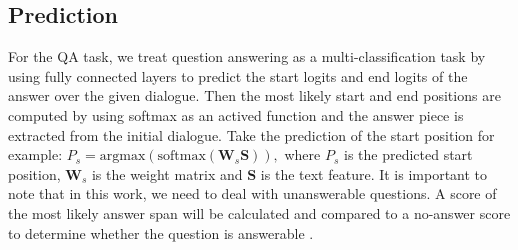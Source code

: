\documentclass[11pt]{article}
\begin{document}
\subsection{Prediction}\label{subsec:answer pred}
For the QA task, we treat question answering as a multi-classification task by using fully connected layers to predict the start logits and end logits of the answer over the given dialogue. Then the most likely start and end positions are computed by using softmax as an actived function and the answer piece is extracted from the initial dialogue. Take the prediction of the start position for example:
$P_s=\textrm{argmax}(\textrm{softmax}(\boldsymbol{W}_{s}\boldsymbol{S})),$ where $P_s$ is the predicted start position, $\boldsymbol{W}_{s}$ is the weight matrix and $\boldsymbol{S}$ is the text feature. It is important to note that in this work, we need to deal with unanswerable questions. A score of the most likely answer span will be calculated and compared to a no-answer score to determine whether the question is answerable \cite{zhang2020retrospective}.
\end{document}
